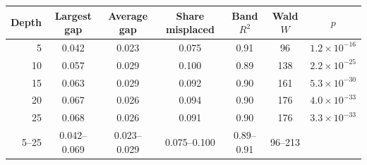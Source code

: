 \begin{tabular}{rcccccc}
\toprule
Depth & Largest gap & Average gap & Share misplaced & Band $R^2$ & Wald $W$ & $p$ \\
\midrule
5 & 0.042 & 0.023 & 0.075 & 0.91 & 96 & $1.2\times 10^{-16}$ \\
10 & 0.057 & 0.029 & 0.100 & 0.89 & 138 & $2.2\times 10^{-25}$ \\
15 & 0.063 & 0.029 & 0.092 & 0.90 & 161 & $5.3\times 10^{-30}$ \\
20 & 0.067 & 0.026 & 0.094 & 0.90 & 176 & $4.0\times 10^{-33}$ \\
25 & 0.068 & 0.026 & 0.091 & 0.90 & 176 & $3.3\times 10^{-33}$ \\
\midrule
5--25 & 0.042--0.069 & 0.023--0.029 & 0.075--0.100 & 0.89--0.91 & 96--213 & \\
\bottomrule
\end{tabular}
